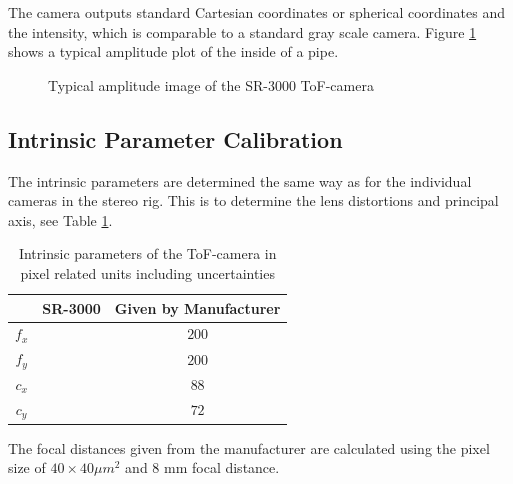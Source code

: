 The camera outputs standard Cartesian coordinates or spherical coordinates and the
intensity, which is comparable to a standard gray scale camera. Figure 
\ref{chap3:fig-tof-amppicture} shows a typical amplitude plot of the inside of a pipe.
\begin{figure}[htbp]
    \centering
    \caption{Typical amplitude image of the SR-3000 ToF-camera}
    \label{chap3:fig-tof-amppicture}
\end{figure}


\subsection{Intrinsic Parameter Calibration}
The intrinsic parameters are determined the same way as for the individual cameras in the
stereo rig. This is to determine the lens distortions and principal axis, see Table
\ref{chap3:tab-intrinsic-sr3000}.
\begin{table}[htbp]
  \centering
    \begin{tabular}{|c|c|c|} 
        \hline
                & SR-3000       & Given by Manufacturer \\
        \hline
        $f_x$   & $ $  & $200$  \\
        $f_y$   & $ $  & $200$  \\
        \hline
        $c_x$   & $ $  & $88$ \\
        $c_y$   & $ $ & $72$  \\
        \hline
    \end{tabular}
    \caption{Intrinsic parameters of the ToF-camera in pixel related units including
    uncertainties}
    \label{chap3:tab-intrinsic-sr3000}
\end{table}
The focal distances given from the manufacturer are calculated using the pixel size of
$40 \times 40 \mu m^2$ and 8 mm focal distance.

